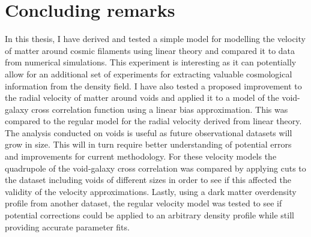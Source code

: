\chapter{Concluding remarks}\label{sec:conclusion}
In this thesis, I have derived and tested a simple model for modelling the velocity of matter around cosmic filaments using linear theory and compared it to data from numerical simulations. This experiment is interesting as it can potentially allow for an additional set of experiments for extracting valuable cosmological information from the density field. I have also tested a proposed improvement to the radial velocity of matter around voids and applied it to a model of the void-galaxy cross correlation function using a linear bias approximation. This was compared to the regular model for the radial velocity derived from linear theory. The analysis conducted on voids is useful as future observational datasets will grow in size. This will in turn require better understanding of potential errors and improvements for current methodology. For these velocity models the quadrupole of the void-galaxy cross correlation was compared by applying cuts to the dataset including voids of different sizes in order to see if this affected the validity of the velocity approximations. Lastly, using a dark matter overdensity profile from another dataset, the regular velocity model was tested to see if potential corrections could be applied to an arbitrary density profile while still providing accurate parameter fits.
